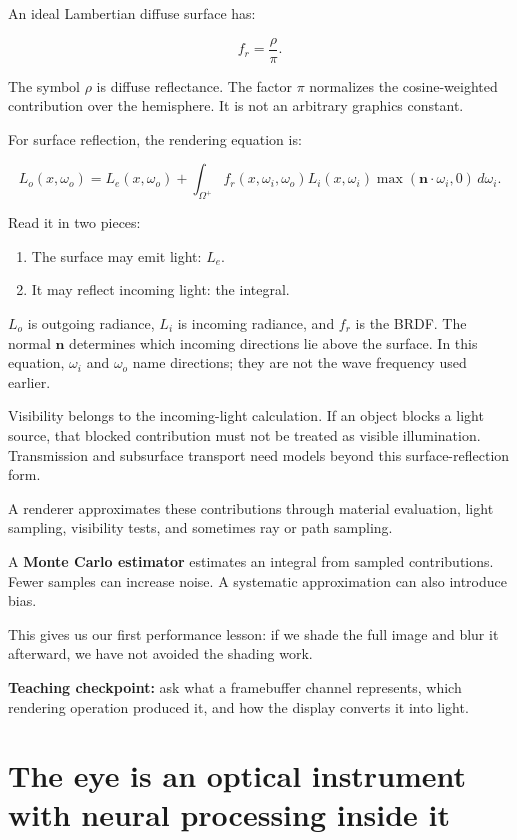 An ideal Lambertian diffuse surface has:

\[
f_r=\frac{\rho}{\pi}.
\]

The symbol \(\rho\) is diffuse reflectance. The factor \(\pi\) normalizes the cosine-weighted contribution over the hemisphere. It is not an arbitrary graphics constant.

For surface reflection, the rendering equation is:

\[
L_o(x,\omega_o)=L_e(x,\omega_o)+
\int_{\Omega^+}
f_r(x,\omega_i,\omega_o)L_i(x,\omega_i)
\max(\mathbf n\cdot\omega_i,0)\,d\omega_i.
\]

Read it in two pieces:

\begin{enumerate}
\def\labelenumi{\arabic{enumi}.}
\tightlist
\item
  The surface may emit light: \(L_e\).
\item
  It may reflect incoming light: the integral.
\end{enumerate}

\(L_o\) is outgoing radiance, \(L_i\) is incoming radiance, and \(f_r\) is the BRDF. The normal \(\mathbf n\) determines which incoming directions lie above the surface. In this equation, \(\omega_i\) and \(\omega_o\) name directions; they are not the wave frequency used earlier.

Visibility belongs to the incoming-light calculation. If an object blocks a light source, that blocked contribution must not be treated as visible illumination. Transmission and subsurface transport need models beyond this surface-reflection form.

A renderer approximates these contributions through material evaluation, light sampling, visibility tests, and sometimes ray or path sampling.

A \textbf{Monte Carlo estimator} estimates an integral from sampled contributions. Fewer samples can increase noise. A systematic approximation can also introduce bias.

This gives us our first performance lesson: if we shade the full image and blur it afterward, we have not avoided the shading work.

\textbf{Teaching checkpoint:} ask what a framebuffer channel represents, which rendering operation produced it, and how the display converts it into light.

\section{The eye is an optical instrument with neural processing inside it}\label{04-visual-computing-ii-ch043-the-eye-is-an-optical-instrument-with-neural-processing-inside-it}

